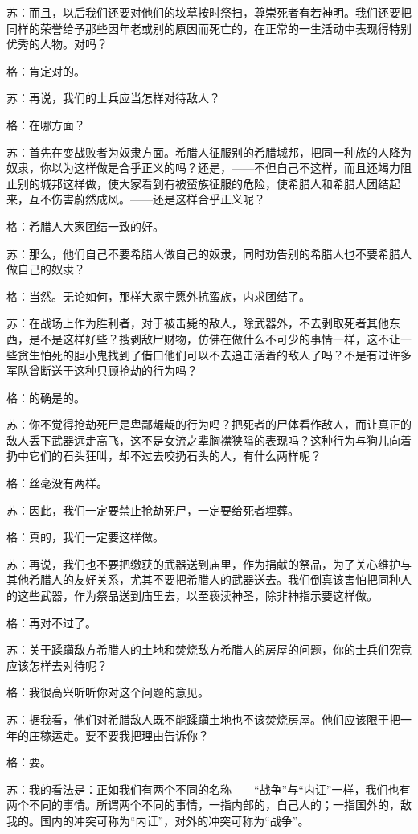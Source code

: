 \documentclass[12pt,oneside]{book}
\begin{document}
苏：而且，以后我们还要对他们的坟墓按时祭扫，尊崇死者有若神明。我们还要把同样的荣誉给予那些因年老或别的原因而死亡的，在正常的一生活动中表现得特别优秀的人物。对吗？

格：肯定对的。

苏：再说，我们的士兵应当怎样对待敌人？

格：在哪方面？

苏：首先在变战败者为奴隶方面。希腊人征服别的希腊城邦，把同一种族的人降为奴隶，你以为这样做是合乎正义的吗？还是，——不但自己不这样，而且还竭力阻止别的城邦这样做，使大家看到有被蛮族征服的危险，使希腊人和希腊人团结起来，互不伤害蔚然成风。——还是这样合乎正义呢？

格：希腊人大家团结一致的好。

苏：那么，他们自己不要希腊人做自己的奴隶，同时劝告别的希腊人也不要希腊人做自己的奴隶？

格：当然。无论如何，那样大家宁愿外抗蛮族，内求团结了。

苏：在战场上作为胜利者，对于被击毙的敌人，除武器外，不去剥取死者其他东西，是不是这样好些？搜剥敌尸财物，仿佛在做什么不可少的事情一样，这不让一些贪生怕死的胆小鬼找到了借口他们可以不去追击活着的敌人了吗？不是有过许多军队曾断送于这种只顾抢劫的行为吗？

格：的确是的。

苏：你不觉得抢劫死尸是卑鄙龌龊的行为吗？把死者的尸体看作敌人，而让真正的敌人丢下武器远走高飞，这不是女流之辈胸襟狭隘的表现吗？这种行为与狗儿向着扔中它们的石头狂叫，却不过去咬扔石头的人，有什么两样呢？

格：丝毫没有两样。

苏：因此，我们一定要禁止抢劫死尸，一定要给死者埋葬。

格：真的，我们一定要这样做。

苏：再说，我们也不要把缴获的武器送到庙里，作为捐献的祭品，为了关心维护与其他希腊人的友好关系，尤其不要把希腊人的武器送去。我们倒真该害怕把同种人的这些武器，作为祭品送到庙里去，以至亵渎神圣，除非神指示要这样做。

格：再对不过了。

苏：关于蹂躏敌方希腊人的土地和焚烧敌方希腊人的房屋的问题，你的士兵们究竟应该怎样去对待呢？

格：我很高兴听听你对这个问题的意见。

苏：据我看，他们对希腊敌人既不能蹂躏土地也不该焚烧房屋。他们应该限于把一年的庄稼运走。要不要我把理由告诉你？

格：要。

苏：我的看法是：正如我们有两个不同的名称——“战争”与“内讧”一样，我们也有两个不同的事情。所谓两个不同的事情，一指内部的，自己人的；一指国外的，敌我的。国内的冲突可称为“内讧”，对外的冲突可称为“战争”。
\end{document}
